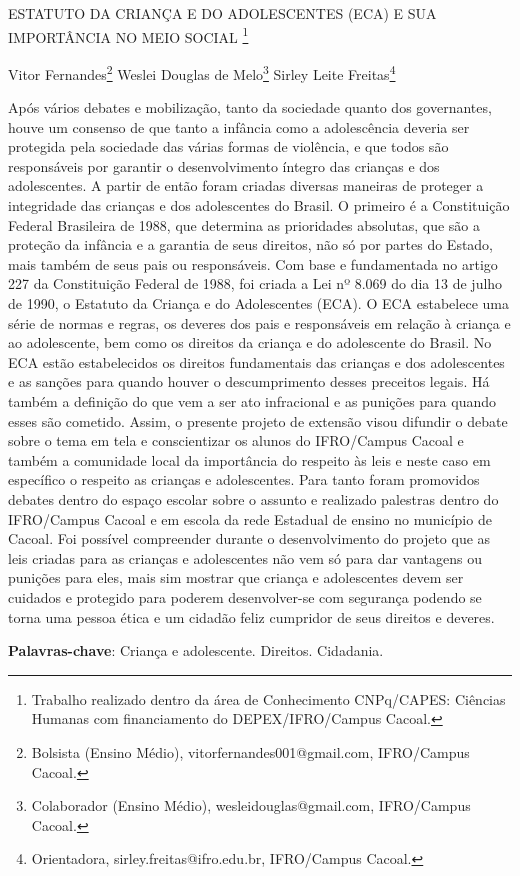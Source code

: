 \documentclass[article,12pt,onesidea,4paper,english,brazil]{abntex2}
\begin{document}
	
	
	\frenchspacing 
	
	\begin{center}
		\LARGE ESTATUTO DA CRIANÇA E DO ADOLESCENTES (ECA) E SUA IMPORTÂNCIA NO MEIO SOCIAL \footnote{Trabalho realizado dentro da área de Conhecimento CNPq/CAPES: Ciências Humanas com financiamento do DEPEX/IFRO/Campus Cacoal.}
		
		\normalsize
		Vitor Fernandes\footnote{Bolsista (Ensino Médio), vitorfernandes001@gmail.com, IFRO/Campus Cacoal.} 
		Weslei Douglas de Melo\footnote{Colaborador (Ensino Médio), wesleidouglas@gmail.com, IFRO/Campus Cacoal.} 
		Sirley Leite Freitas\footnote{Orientadora, sirley.freitas@ifro.edu.br, IFRO/Campus Cacoal.}  
	\end{center}
	
	\noindent Após vários debates e mobilização, tanto da sociedade quanto dos governantes, houve um consenso de que tanto a infância como a adolescência deveria ser protegida pela sociedade das várias formas de violência, e que todos são responsáveis por garantir o desenvolvimento íntegro das crianças e dos adolescentes. A partir de então foram criadas diversas maneiras de proteger a integridade das crianças e dos adolescentes do Brasil. O primeiro é a Constituição Federal Brasileira de 1988, que determina as prioridades absolutas, que são a proteção da infância e a garantia de seus direitos, não só por partes do Estado, mais também de seus pais ou responsáveis. Com base e fundamentada no artigo 227 da Constituição Federal de 1988, foi criada a Lei nº 8.069 do dia 13 de julho de 1990, o Estatuto da Criança e do Adolescentes (ECA). O ECA estabelece uma série de normas e regras, os deveres dos pais e responsáveis em relação à criança e ao adolescente, bem como os direitos da criança e do adolescente do Brasil. No ECA estão estabelecidos os direitos fundamentais das crianças e dos adolescentes e as sanções para quando houver o descumprimento desses preceitos legais. Há também a definição do que vem a ser ato infracional e as punições para quando esses são cometido. Assim, o presente projeto de extensão visou difundir o debate sobre o tema em tela e conscientizar os alunos do IFRO/Campus Cacoal e também a comunidade local da importância do respeito às leis e neste caso em específico o respeito as crianças e adolescentes. Para tanto foram promovidos debates dentro do espaço escolar sobre o assunto e realizado palestras dentro do IFRO/Campus Cacoal e em escola da rede Estadual de ensino no município de Cacoal. Foi possível compreender durante o desenvolvimento do projeto que as leis criadas para as crianças e adolescentes não vem só para dar vantagens ou punições para eles, mais sim mostrar que criança e adolescentes devem ser cuidados e protegido para poderem desenvolver-se com segurança podendo se torna uma pessoa ética e um cidadão feliz cumpridor de seus direitos e deveres.
	
	\vspace{\onelineskip}
	
	\noindent
	\textbf{Palavras-chave}: Criança e adolescente. Direitos. Cidadania.
	
\end{document}
